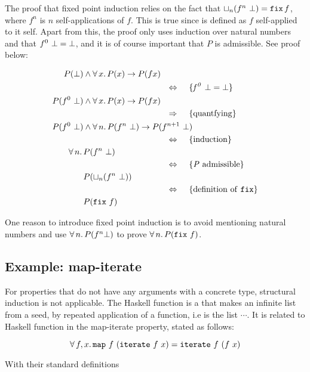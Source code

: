 The proof that fixed point induction relies on the fact that
$\lub{n}(f^n \w \bot) \eq \hs{fix} \, f$, where $f^n$ is $n$
self-applications of $f$. This is true since  is defined as
$f$ self-applied to it self. Apart from this, the proof only uses
induction over natural numbers and that $f^0 \,\, \bot = \bot$, and
it is of course important that $P$ is admissible. See proof below:

\begin{align*}
P(\bot) & \wedge \fa{x} P(x) \rightarrow P(f x) \\
\desclra{\mathit{f^0 \w \bot \eq \bot}} \\
P(f^0 \w \bot) & \wedge \fa{x} P(x) \rightarrow P(f x) \\
\descra{quantfying} \\
P(f^0 \w \bot) & \wedge \fa{n} P(f^n \w \bot) \rightarrow P(f^{n+1} \w \bot) \\
\desclra{induction} \\
\fa{n} & P(f^n \w \bot) \\
\desclra{\mathit{P} \w admissible} \\
& P(\lub{n}(f^n \w \bot)) \\
\desclra{definition \w of \w \hs{fix}} \\
& P(\hs{fix} \w f) \\
\end{align*}

One reason to introduce fixed point induction is to avoid
mentioning natural numbers and use $\forall \, n . \, P(f^n \bot)$ to prove
$\fa{n} P(\hs{fix} \w f)$.

\subsection{Example: map-iterate}
\label{sec:mapiter}

For properties that do not have any arguments with a concrete type,
structural induction is not applicable. The Haskell function
 is a that makes an infinite list from a seed, by repeated
application of a function, i.e  is the list
 $\cdots$. It is related to Haskell function
  in the map-iterate property, stated as follows:

\begin{equation*}
\faa{f}{x} \hs{map} \w f \w (\hs{iterate} \w f \w x) \eq
           \hs{iterate} \w f \w (f \w x)
\end{equation*}

With their standard definitions

